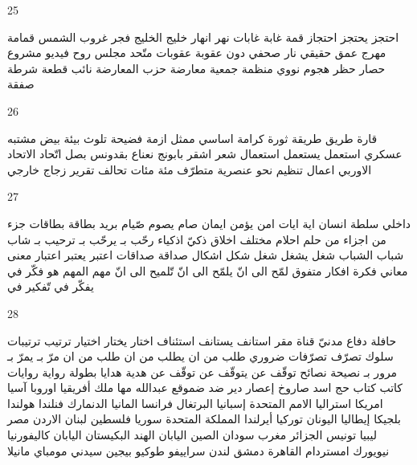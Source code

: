 \documentclass[twocolumn,a4paper]{article}
\begin{document}
25

\textarabic{ احتجز  يحتجز  احتجاز   
 قمة  
 غابة  غابات
 نهر  انهار  
 خليج  
 الخليج  
 فجر  
 غروب الشمس  
 قمامة  
 مهرج  
 عمق  
 حقيقي  
 نار  
 صحفي  
 دون  
 عقوبة  عقوبات
 متّحد  
 مجلس  
 روح  
 فيديو  
 مشروع  
 حصار  
 حظر  
 هجوم  
 نووي  
 منظمة  
 جمعية  
 معارضة  
 حزب المعارضة  
 نائب  
 قطعة  
 شرطة  
 صفقة  
}

26

\textarabic{ قارة  
 طريق  
 طريقة  
 ثورة  
 كرامة  
 اساسي  
 ممثل  
 ازمة  
 فضيحة  
 تلوث  
 بيئة  
 بيض  
 مشتبه  
 عسكري  
 استعمل  يستعمل  استعمال   
 شعر  
 اشقر  
 بابونج  
 نعناع  
 بقدونس  
 بصل  
 اتّحاد  
 الاتحاد الاوربي  
 اعمال  
 تنظيم  
 نحو  
 عنصرية  
 متطرّف  
 مئة  مئات
 تحالف  
 تقرير  
 زجاج  
 خارجي  
}

27

\textarabic{ داخلي  
 سلطة  
 انسان  
 اية  ايات
 امن  يؤمن  ايمان  
 صام  يصوم  صّيام   
 بريد  
 بطاقة  بطاقات
 جزء من  اجزاء من  
 حلم  احلام  
 مختلف  
 اخلاق  
 ذكيّ  اذكياء  
 رحّب بـ  يرحّب بـ  ترحيب بـ   
 شاب  شباب  
 الشباب  
 شغل  يشغل  شغل   
 شكل  اشكال  
 صداقة  صداقات
 اعتبر  يعتبر  اعتبار   
 معنى  معاني  
 فكرة  افكار  
 متفوق  
 لمّح الى انّ  يلمّح الى انّ  تّلميح الى انّ   
 مهم  
 المهم هو  
 فكّر في  يفكّر في  تّفكير في  
}

28

\textarabic{ حافلة  
 دفاع  
 مدنيّ  
 قناة  
 مقر  
 استانف  يستانف  استئناف  
 اختار  يختار  اختيار  
 ترتيب  ترتيبات
 سلوك  
 تصرّف  تصرّفات
 ضروري  
 طلب من ان  يطلب من ان  طلب من ان   
 مرّ بـ  يمرّ بـ  مرور بـ  
 نصيحة  نصائح  
 توقّف عن  يتوقّف عن  توقّف عن  
 هدية  هدايا  
 بطولة  
 رواية  روايات
 كاتب  كتاب  
 حج  
 اسد  
 صاروخ  
 إعصار  
 دير  
 ضد  
 ضموقع  
}\clearpage
\textarabic{
 عبدالله  
 مها  
 ملك  
}\clearpage
\textarabic{
 أفريقيا  
 اوروبا  
 آسيا  
 امريكا  
 استراليا  
 اﻻمم المتحدة  
 إسبانيا  
 البرتغال  
 فرانسا  
 المانيا  
  الدنمارك  
 فنلندا  
 هولندا  
 بلجيكا  
 إيطاليا  
 اليونان  
 توركيا  
 أيرلندا  
 المملكة المتحدة 
 سوريا  
 فلسطين  
 لبنان  
 الاردن  
 مصر  
 ليبيا  
 تونيس  
 الجزائر  
 مغرب  
 سودان  
 الصين  
 اليابان  
 الهند  
 البكيستان  
 اليابان  
 كاليفورنيا  
 نيويورك  
 امستردام  
 القاهرة  
 دمشق  
 لندن  
 سراييفو  
 طوكيو  
 بيجين  
 سيدني  
 مومباي  
 مانيلا  
}
\end{document}
